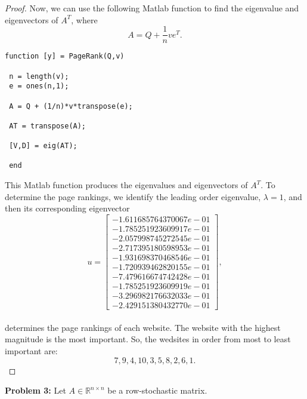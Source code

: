 \documentclass[12pt]{article}
\def\R{\mathbb{R}}
\begin{document}
\begin{proof}
Now, we can use the following Matlab function to find the eigenvalue and eigenvectors of $A^T$, where\\
$$ A = Q + \frac{1}{n}ve^T.$$

\lstset{language=matlab,frame=single}
\begin{lstlisting}[caption=PageRank Function]
function [y] = PageRank(Q,v)
 
 n = length(v);
 e = ones(n,1);
 
 A = Q + (1/n)*v*transpose(e);
 
 AT = transpose(A);
 
 [V,D] = eig(AT);
 
 end
\end{lstlisting}
$\text{ }$ \\
This Matlab function produces the eigenvalues and eigenvectors of $A^T$.  To determine the page rankings, we identify the leading order eigenvalue, $\lambda = 1$, and then its corresponding eigenvector \\
$$u = \begin{bmatrix}
		-1.611685764370067e-01 \\
		-1.785251923609917e-01 \\
		-2.057998745272545e-01 \\
		-2.717395180598953e-01 \\
		-1.931698370468546e-01 \\
		-1.720939462820155e-01 \\
		-7.479616674742428e-01 \\
		-1.785251923609919e-01 \\
		-3.296982176632033e-01 \\
		-2.429151380432770e-01
	\end{bmatrix},$$\\

determines the page rankings of each website.  The website with the highest magnitude is the most important.  So, the wedsites in order from most to least important are:
$$7, 9, 4, 10, 3, 5, 8, 2, 6, 1.$$

\end{proof}

\bigskip\bigskip
\noindent
\textbf{Problem 3:} Let $A \in \R^{n\times n}$ be a row-stochastic matrix.\\
\end{document}

